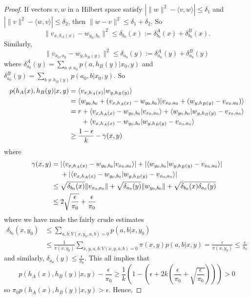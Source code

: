 \documentclass[11pt]{amsart}
\theoremstyle{definition}
\begin{document}
\begin{proof}
If vectors $v,w$ in a Hilbert space satisfy $|\|w\|^2-\langle v,w\rangle|\leq \delta_1$ and $|\|v\|^2-\langle w,v\rangle|\leq \delta_2$, then $\|w-v\|^2\leq \delta_1+\delta_2$.
So
\[ \|v_{x,h_A(x)}-w_{y_0,b_0}\|^2\leq \delta_{b_0}(x):= \delta_{b_0}^A(x)+\delta_{b_0}^B(x).\]
Similarly,
\[ \|v_{x_0,a_0}-w_{y,h_B(y)}\|^2\leq \delta_{a_0}(y):=\delta_{a_0}^A(y)+\delta_{a_0}^B(y)\]
where
$\delta_{a_0}^A(y)=\sum_{a\ne a_0}p(a,h_B(y)|x_0,y)$
and
$\delta_{a_0}^B(y)=\sum_{b\ne h_B(y)}p(a_0,b|x_0,y)$.
So
\begin{align*}
  p(h_A(x),h_B(y)|x,y)
  &
  =\langle v_{x,h_A(x)}|w_{y,h_B(y)}\rangle
  \\&=\langle w_{y_0,b_0}+(v_{x,h_A(x)}-w_{y_0,b_0})|v_{x_0,a_0}+(w_{y,h_B(y)}-v_{x_0,a_0})\rangle
  \\&=r +\langle v_{x,h_A(x)}-w_{y_0,b_0}|v_{x_0,a_0}\rangle+\langle w_{y_0,b_0}|w_{y,h_B(y)}-v_{x_0,a_0}\rangle\\&\hphantom{{}=r{}}+\langle v_{x,h_A(x)}-w_{y_0,b_0}|w_{y,h_B(y)}-v_{x_0,a_0}\rangle
  \\
  &\ge  \frac{1-\epsilon}{k}-\gamma(x,y)
\end{align*}
where
\begin{align*}
  \gamma(x,y)
  &=|\langle v_{x,h_A(x)}-w_{y_0,b_0}|v_{x_0,a_0}\rangle|+|\langle w_{y_0,b_0}|w_{y,h_B(y)}-v_{x_0,a_0}\rangle|\\&\hphantom{{}={}}+|\langle v_{x,h_A(x)}-w_{y_0,b_0}|w_{y,h_B(y)}-v_{x_0,a_0}\rangle|\\
  &\le \sqrt{\delta_{b_0}(x)}\|v_{x_0,a_0}\|+\sqrt{\delta_{a_0}(y)}\|w_{y_0,b_0}\|+\sqrt{\delta_{b_0}(x)\delta_{a_0}(y)}
  \\
  &\leq 2\sqrt{\frac{\epsilon}{\pi_0}}+\frac{\epsilon}{\pi_0}%
\end{align*}
where we have made the fairly crude estimates
\begin{align*}\delta_{b_0}(x,y_0)&\le \sum_{a,b:V(x,y_0,a,b)=0}p(a,b|x,y_0)\\&\leq \frac1{\pi(x,y_0)}\sum_{x,y,a,b:V(x,y,a,b)=0}\pi(x,y)p(a,b|x,y)=\frac{\epsilon}{\pi(x,y_0)}\leq \frac{\epsilon}{\pi_0}
\end{align*}
and similarly, $\delta_{a_0}(y)\le \frac{\epsilon}{\pi_0}$. %
This all implies that
\begin{equation*}
  p(h_A(x),h_B(y)|x,y)-\frac\epsilon{\pi_0} \ge \frac1k\left(1-\left(\epsilon+2k\left(\frac\epsilon{\pi_0}+\sqrt{\frac{\epsilon}{\pi_0}}\right)\right)\right)>0
\end{equation*}
so $\pi_0 p(h_A(x),h_B(y)|x,y)>\epsilon$. Hence,

\end{proof}
\end{document}
